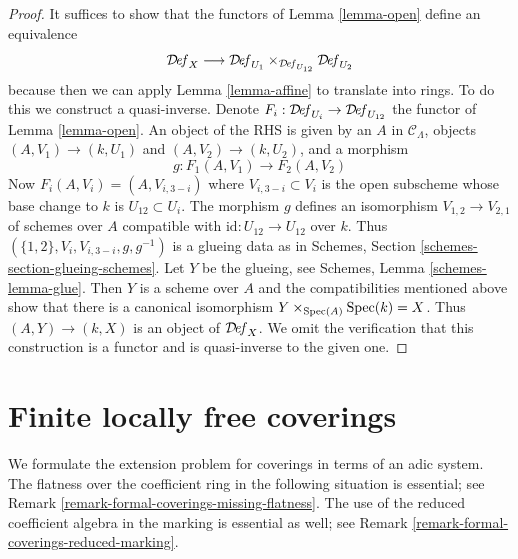 \begin{proof}
It suffices to show that the functors of Lemma \ref{lemma-open}
define an equivalence
$$
\mathcal{D}\!\mathit{ef}_X \longrightarrow
\mathcal{D}\!\mathit{ef}_{U_1}
\times_{\mathcal{D}\!\mathit{ef}_{U_{12}}}
\mathcal{D}\!\mathit{ef}_{U_2}
$$
because then we can apply Lemma \ref{lemma-affine} to translate into rings.
To do this we construct a quasi-inverse. Denote
$F_i : \mathcal{D}\!\mathit{ef}_{U_i} \to \mathcal{D}\!\mathit{ef}_{U_{12}}$
the functor of Lemma \ref{lemma-open}.
An object of the RHS is given by an $A$ in $\mathcal{C}_\Lambda$,
objects $(A, V_1) \to (k, U_1)$ and $(A, V_2) \to (k, U_2)$, and
a morphism
$$
g : F_1(A, V_1) \to F_2(A, V_2)
$$
Now $F_i(A, V_i) = (A, V_{i, 3 - i})$ where $V_{i, 3 - i} \subset V_i$
is the open subscheme whose base change to $k$ is $U_{12} \subset U_i$.
The morphism $g$ defines an isomorphism
$V_{1, 2} \to V_{2, 1}$ of schemes over $A$ compatible
with $\text{id} : U_{12} \to U_{12}$ over $k$.
Thus $(\{1, 2\}, V_i, V_{i, 3 - i}, g, g^{-1})$ is a glueing
data as in Schemes, Section \ref{schemes-section-glueing-schemes}.
Let $Y$ be the glueing, see Schemes, Lemma \ref{schemes-lemma-glue}.
Then $Y$ is a scheme over $A$ and the
compatibilities mentioned above show that
there is a canonical isomorphism
$Y \times_{\mathop{\mathrm{Spec}}(A)} \mathop{\mathrm{Spec}}(k) = X$.
Thus $(A, Y) \to (k, X)$ is an object of $\mathcal{D}\!\mathit{ef}_X$.
We omit the verification that this construction is a functor
and is quasi-inverse to the given one.
\end{proof}






\section{Finite locally free coverings}
\label{section-finite-locally-free-coverings}

\noindent
We formulate the extension problem for coverings in terms of an adic system.
The flatness over the coefficient ring in the following situation is
essential; see Remark \ref{remark-formal-coverings-missing-flatness}. The
use of the reduced coefficient algebra in the marking is essential as well;
see Remark \ref{remark-formal-coverings-reduced-marking}.

